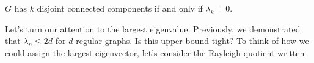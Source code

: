 \begin{corollary}
$G$ has $k$ disjoint connected components if and only if $\lambda_k = 0$.
\end{corollary}

Let's turn our attention to the largest eigenvalue. Previously, we demonstrated that $\lambda_n \leq 2d$ for $d$-regular graphs. Is this upper-bound tight? To think of how we could assign the largest eigenvector, let's consider the Rayleigh quotient written

